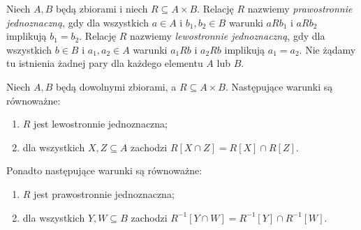 \begin{definicja}
\label{def:relation-unique-fibers-xlii}
Niech $A,B$ będą zbiorami i niech $R\subseteq A\times B$. Relację $R$ nazwiemy
\emph{prawostronnie jednoznaczną}, gdy dla wszystkich
$a\in A$ i $b_1,b_2\in B$ warunki $aRb_1$ i $aRb_2$
implikują $b_1=b_2$. Relację $R$ nazwiemy
\emph{lewostronnie jednoznaczną}, gdy dla wszystkich
$b\in B$ i $a_1,a_2\in A$ warunki $a_1Rb$ i $a_2Rb$
implikują $a_1=a_2$. Nie żądamy tu istnienia
żadnej pary dla każdego elementu $A$ lub $B$.
\end{definicja}

\begin{twierdzenie}
\label{thm:relation-images-intersections-xlii}
Niech $A,B$ będą dowolnymi zbiorami, a
$R\subseteq A\times B$. Następujące warunki są
równoważne:
\begin{enumerate}[label=(\roman*)]
\item $R$ jest lewostronnie jednoznaczna;
\item dla wszystkich $X,Z\subseteq A$ zachodzi
$R[X\cap Z]=R[X]\cap R[Z]$.
\end{enumerate}
Ponadto następujące warunki są równoważne:
\begin{enumerate}[label=(\roman*)]
\item $R$ jest prawostronnie jednoznaczna;
\item dla wszystkich $Y,W\subseteq B$ zachodzi
$R^{-1}[Y\cap W]=R^{-1}[Y]\cap R^{-1}[W]$.
\end{enumerate}
\end{twierdzenie}
